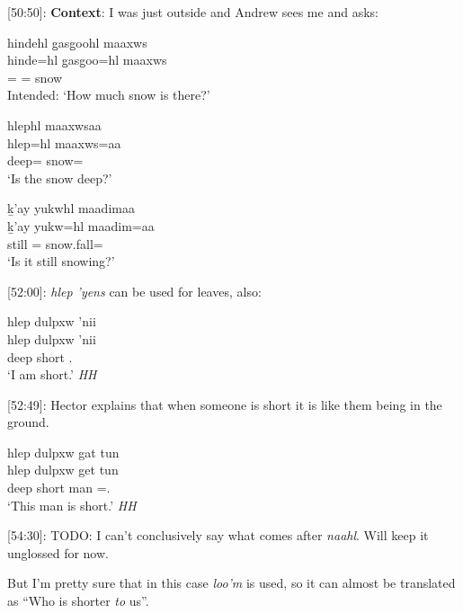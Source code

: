 [50:50]: \textbf{Context}: I was just outside and Andrew sees me and asks:

\begin{exe}
    \ex
    \begin{xlist}
        \item \glll * hindehl g̱asg̱oohl maaxws \\
    {} hinde=hl g̱asg̱oo=hl maaxws \   \\
    {} \Wh{}=\Cn{} \Mass{}=\Cn{} snow \\
    Intended: `How much snow is there?' 
        \item \glll hlephl maaxwsaa \\
    hlep=hl maaxws=aa  \\
    deep=\Cn{} snow=\Q{} \\
    `Is the snow deep?' 
    \item \glll ḵ'ay yukwhl maadimaa \\
    ḵ'ay yukw=hl maadim=aa  \\
    still \Prog{}=\Cn{} snow.fall=\Q{} \\
    `Is it still snowing?' 
    \end{xlist} 
\end{exe}

[52:00]: \textit{hlep 'yens} can be used for leaves, also:

\begin{exe}
    \ex \glll hlep dulpxw 'nii \\
    hlep dulpxw 'nii   \\
    deep short \Fsg{}.\Iii{} \\
    `I am short.' \textit{HH} 
\end{exe}

[52:49]: Hector explains that when someone is short it is like them being in the ground.

\begin{exe}
    \ex \glll hlep dulpxw gat tun \\
    hlep dulpxw get tun   \\
    deep short man \Pn{}=\Dem{}.\Prox{} \\
    `This man is short.' \textit{HH}
\end{exe}

[54:30]: TODO: I can't conclusively say what comes after \textit{naahl}. Will keep it unglossed for now.

But I'm pretty sure that in this case \textit{loo'm} is used, so it can almost be translated as ``Who is shorter \textit{to} us''.

